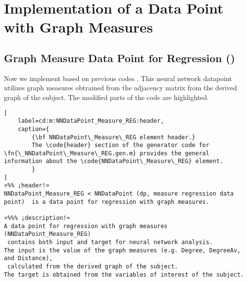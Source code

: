 \documentclass{tufte-handout}
\begin{document}
\clearpage
\section{Implementation of a Data Point with Graph Measures}
\subsection{Graph Measure Data Point for Regression ()}

Now we implement  based on previous codes .
This neural network datapoint utilizes graph measures obtrained from the adjacency matrix from the derived graph of the subject. 
The modified parts of the code are highlighted.

\begin{lstlisting}[
	label=cd:m:NNDataPoint_Measure_REG:header,
	caption={
		{\bf NNDataPoint\_Measure\_REG element header.}
		The \code{header} section of the generator code for \fn{\_NNDataPoint\_Measure\_REG.gen.m} provides the general information about the \code{NNDataPoint\_Measure\_REG} element.
		}
]
¤%% ¡header!¤
NNDataPoint_Measure_REG < NNDataPoint (dp, measure regression data point)  is a data point for regression with graph measures.

¤%%% ¡description!¤
A data point for regression with graph measures (NNDataPoint_Measure_REG) 
 contains both input and target for neural network analysis.
The input is the value of the graph measures (e.g. Degree, DegreeAv, and Distance), 
 calculated from the derived graph of the subject.
The target is obtained from the variables of interest of the subject.
\end{lstlisting}
\end{document}
